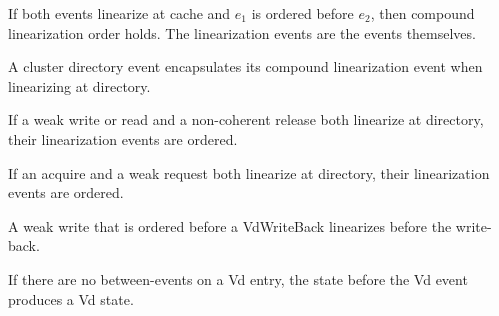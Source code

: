 \begin{lemma}
  \label{lem:ob_linearizes_at_cache}
  \leanok
  If both events linearize at cache and $e_1$ is ordered before $e_2$,
  then compound linearization order holds.
  The linearization events are the events themselves.
\end{lemma}

\begin{lemma}
  \label{lem:cdir_encap_glin_at_dir}
  \leanok
  A cluster directory event encapsulates its compound linearization event
  when linearizing at directory.
\end{lemma}

\begin{lemma}
  \label{lem:weak_and_nc_release_at_dir}
  \leanok
  If a weak write or read and a non-coherent release both linearize at
  directory, their linearization events are ordered.
\end{lemma}

\begin{lemma}
  \label{lem:acquire_and_weak_at_dir}
  \leanok
  If an acquire and a weak request both linearize at directory,
  their linearization events are ordered.
\end{lemma}

\begin{lemma}
  \label{lem:weak_write_ob_vd_wb}
  \leanok
  A weak write that is ordered before a VdWriteBack linearizes before the
  write-back.
\end{lemma}

\begin{lemma}
  \label{lem:state_before_vd_no_btn}
  \leanok
  If there are no between-events on a Vd entry, the state before the Vd
  event produces a Vd state.
\end{lemma}

